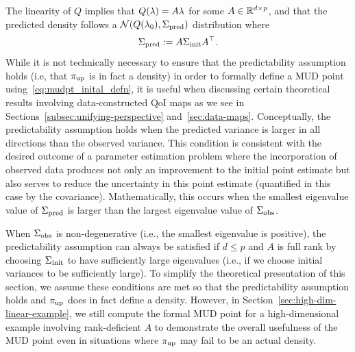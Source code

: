 The linearity of $Q$ implies that $Q(\lambda)=A\lambda$ for some $A\in\mathbb{R}^{d\times p}$, and that the predicted density follows a $\mathcal{N}(Q(\lambda_0), \Sigma_\text{pred})$ distribution where
\begin{equation}\label{eq:predictCov}
	\Sigma_\text{pred} := A\Sigma_\text{init} A^\top.
\end{equation}
While it is not technically necessary to ensure that the predictability assumption holds (i.e, that $\operatorname*{\pi_{up}}$ is in fact a density) in order to formally define a MUD point using~\eqref{eq:mudpt_inital_defn}, it is useful when discussing certain theoretical results involving data-constructed QoI maps as we see in Sections~\ref{subsec:unifying-perspective} and~\ref{sec:data-maps}.
Conceptually, the predictability assumption holds when the predicted variance is larger in all directions than the observed variance.
This condition is consistent with the desired outcome of a parameter estimation problem where the incorporation of observed data produces not only an improvement to the initial point estimate but also serves to reduce the uncertainty in this point estimate (quantified in this case by the covariance).
Mathematically, this occurs when the smallest eigenvalue value of $\Sigma_\text{pred}$ is larger than the largest eigenvalue value of $\Sigma_\text{obs}$.

When $\Sigma_\text{obs}$ is non-degenerative (i.e., the smallest eigenvalue is positive), the predictability assumption can always be satisfied if $d\leq p$ and $A$ is full rank by choosing $\Sigma_\text{init}$ to have sufficiently large eigenvalues (i.e., if we choose initial variances to be sufficiently large).
To simplify the theoretical presentation of this section, we assume these conditions are met so that the predictability assumption holds and $\operatorname*{\pi_{up}}$ does in fact define a density.
However, in Section~\ref{sec:high-dim-linear-example}, we still compute the formal MUD point for a high-dimensional example involving rank-deficient $A$ to demonstrate the overall usefulness of the MUD point even in situations where $\operatorname*{\pi_{up}}$ may fail to be an actual density.


